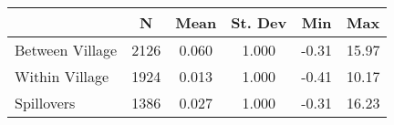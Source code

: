 \begin{tabular}{l*{5}{c}}\hline&\multicolumn{1}{c}{N}&\multicolumn{1}{c}{Mean}&\multicolumn{1}{c}{St. Dev}&\multicolumn{1}{c}{Min}&\multicolumn{1}{c}{Max}\\ \hline 
Between Village & 2126 & 0.060 & 1.000 & -0.31 & 15.97 \\
Within Village & 1924 & 0.013 & 1.000 & -0.41 & 10.17 \\
Spillovers & 1386 & 0.027 & 1.000 & -0.31 & 16.23 \\
\hline \end{tabular}
